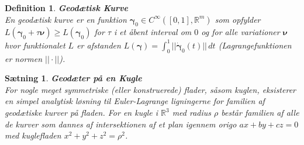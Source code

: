\documentclass[12pt]{article}
\newtheorem{thm}{Sætning}
\newtheorem{dfn}{Definition}
\begin{document}
\newpage


\begin{dfn} {\bf Geodætisk Kurve}\\
En geodætisk kurve er en funktion ${\boldsymbol \gamma}_0 \in C^\infty ([0,1],\mathbb{R}^m)$ som opfylder $L({\boldsymbol \gamma}_0+\tau {\boldsymbol \nu}) \geq L({\boldsymbol \gamma}_0)$ for $\tau$ i et åbent interval om $0$ og for alle variationer ${\boldsymbol \nu}$ hvor funktionalet $L$ er afstanden $L({\boldsymbol \gamma})=\int^1_0 ||\dot{\boldsymbol \gamma}_0(t)|| \, dt$ (Lagrangefunktionen er normen $||\cdot||$).
\end{dfn}

\begin{thm} {\bf Geodæter på en Kugle}\\
\noindent For nogle meget symmetriske (eller konstruerede) flader, såsom kuglen, eksisterer en simpel analytisk løsning til Euler-Lagrange ligningerne for familien af geodætiske kurver på fladen. For en kugle i $\mathbb{R}^3$ med radius $\rho$ består familien af alle de kurver som dannes af intersektionen af et plan igennem origo $ax+by+cz=0$ med kuglefladen $x^2 + y^2 +z^2 =\rho^2$. 
\end{thm}
\end{document}
